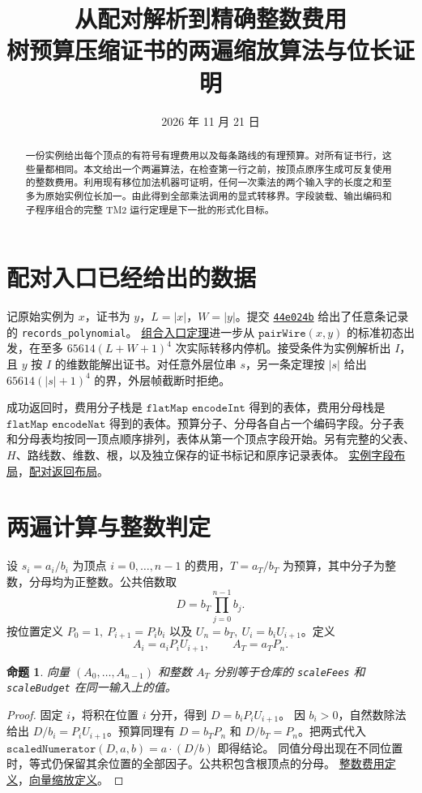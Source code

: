 \documentclass[UTF8,fontset=fandol,11pt,a4paper]{ctexart}
\title{从配对解析到精确整数费用\\[2pt]\large 树预算压缩证书的两遍缩放算法与位长证明}
\author{}
\date{2026 年 11 月 21 日}
\newtheorem{proposition}{命题}
\newcommand{\len}[1]{\lvert #1\rvert}
\newcommand{\src}[2]{\href{https://github.com/huam54925-cpu/uav-routing-certification/blob/b083efc56ecf5b4f96f2e5b06134d1ed05806351/LeanCompletion/UAV/#1.lean}{#2}}
\begin{document}
\maketitle
\begin{abstract}
一份实例给出每个顶点的有符号有理费用以及每条路线的有理预算。对所有证书行，这些量都相同。本文给出一个两遍算法，在检查第一行之前，按顶点原序生成可反复使用的整数费用。利用现有移位加法机器可证明，任何一次乘法的两个输入字的长度之和至多为原始实例位长加一。由此得到全部乘法调用的显式转移界。字段装载、输出编码和子程序组合的完整 TM2 运行定理是下一批的形式化目标。
\end{abstract}

\section{配对入口已经给出的数据}

记原始实例为 \(x\)，证书为 \(y\)，\(L=\len{x}\)，\(W=\len{y}\)。提交
\href{https://github.com/huam54925-cpu/uav-routing-certification/commit/44e024b63efffe6c181ddf6836a56d7b7591b4b6}{\texttt{44e024b}}
给出了任意条记录的 \texttt{records\_polynomial}。
\src{TreeBudgetPairedParserTotal}{组合入口定理}进一步从
\(\texttt{pairWire}(x,y)\) 的标准初态出发，在至多
\(65614(L+W+1)^4\) 次实际转移内停机。接受条件为实例解析出 \(I\)，且 \(y\) 按 \(I\) 的维数能解出证书。对任意外层位串 \(s\)，另一条定理按 \(\len{s}\) 给出 \(65614(\len{s}+1)^4\) 的界，外层帧截断时拒绝。

成功返回时，费用分子栈是 \(\texttt{flatMap encodeInt}\) 得到的表体，费用分母栈是 \(\texttt{flatMap encodeNat}\) 得到的表体。预算分子、分母各自占一个编码字段。分子表和分母表均按同一顶点顺序排列，表体从第一个顶点字段开始。另有完整的父表、\(H\)、路线数、维数、根，以及独立保存的证书标记和原序记录表体。
\src{TreeBudgetInstanceTotal}{实例字段布局}，\src{TreeBudgetPairedParserTM2}{配对返回布局}。

\section{两遍计算与整数判定}

设 \(s_i=a_i/b_i\) 为顶点 \(i=0,\ldots,n-1\) 的费用，\(T=a_T/b_T\) 为预算，其中分子为整数，分母均为正整数。公共倍数取
\[
 D=b_T\prod_{j=0}^{n-1} b_j .
\]
按位置定义 \(P_0=1,\ P_{i+1}=P_i b_i\) 以及 \(U_n=b_T,\ U_i=b_i U_{i+1}\)。定义
\[
 A_i=a_iP_iU_{i+1},\qquad A_T=a_TP_n.
\]

\begin{proposition}
向量 \((A_0,\ldots,A_{n-1})\) 和整数 \(A_T\) 分别等于仓库的
\texttt{scaleFees} 和 \texttt{scaleBudget} 在同一输入上的值。
\end{proposition}
\begin{proof}
固定 \(i\)，将积在位置 \(i\) 分开，得到 \(D=b_iP_iU_{i+1}\)。
因 \(b_i>0\)，自然数除法给出 \(D/b_i=P_iU_{i+1}\)。预算同理有
\(D=b_TP_n\) 和 \(D/b_T=P_n\)。把两式代入
\(\texttt{scaledNumerator}(D,a,b)=a\cdot (D/b)\) 即得结论。
同值分母出现在不同位置时，等式仍保留其余位置的全部因子。公共积包含根顶点的分母。
\src{TreeBudgetIntegerCost}{整数费用定义}，\src{TreeBudgetVectorChecker}{向量缩放定义}。
\end{proof}
\end{document}
